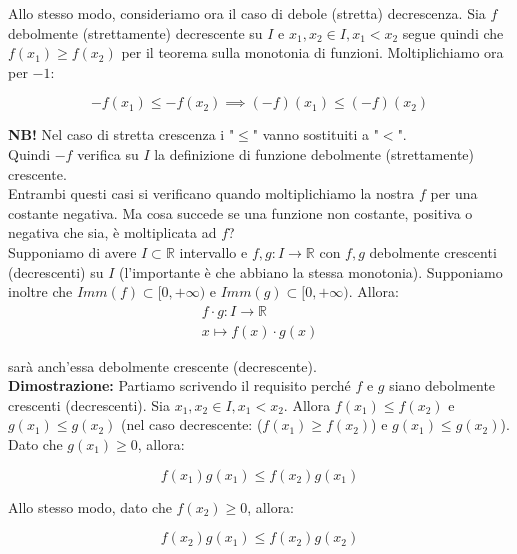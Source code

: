 \documentclass{article}
\begin{document}
\noindent Allo stesso modo, consideriamo ora il caso di debole (stretta) decrescenza. Sia $f$ debolmente (strettamente) decrescente su $I$ e $x_1, x_2 \in I, x_1 < x_2$ segue quindi che $f(x_1) \geq f(x_2)$ per il teorema sulla monotonia di funzioni. Moltiplichiamo ora per $-1$:

\begin{equation*}
    -f(x_1) \leq - f(x_2) \implies  (-f)(x_1) \leq (-f)(x_2)
\end{equation*}

\noindent\textbf{NB!} Nel caso di stretta crescenza i "$\leq$" vanno sostituiti a "$<$".\\

\noindent Quindi $-f$ verifica su $I$ la definizione di funzione debolmente (strettamente) crescente. \\

\noindent Entrambi questi casi si verificano quando moltiplichiamo la nostra $f$ per una costante negativa. Ma cosa succede se una funzione non costante, positiva o negativa che sia, è moltiplicata ad $f$? \\
Supponiamo di avere $I \subset \mathbb{R}$ intervallo e $f, g: I \xrightarrow{} \mathbb{R}$ con $f, g$ debolmente crescenti (decrescenti) su $I$ (l'importante è che abbiano la stessa monotonia). Supponiamo inoltre che $Imm(f) \subset [0, +\infty)$ e $Imm(g) \subset [0, +\infty)$. Allora:
\begin{gather*}
    f \cdot g: I \xrightarrow{} \mathbb{R}\\
    x \longmapsto f(x) \cdot g(x)
\end{gather*}

\noindent sarà anch'essa debolmente crescente (decrescente). \\

\noindent\textbf{Dimostrazione:} Partiamo scrivendo il requisito perché $f$ e $g$ siano debolmente crescenti (decrescenti). Sia $x_1, x_2 \in I, x_1 < x_2$. Allora $f(x_1) \leq f(x_2)$ e $g(x_1) \leq g(x_2)$ (nel caso decrescente: ($f(x_1) \geq f(x_2)$) e $g(x_1) \leq g(x_2)$). Dato che $g(x_1) \geq 0$, allora:

\begin{equation}
    f(x_1)g(x_1) \leq f(x_2)g(x_1)
    \label{eq:9}    
\end{equation}

\noindent Allo stesso modo, dato che $f(x_2) \geq 0$, allora:

\begin{equation}
    f(x_2)g(x_1) \leq f(x_2)g(x_2)
    \label{eq:10}    
\end{equation}
\end{document}
